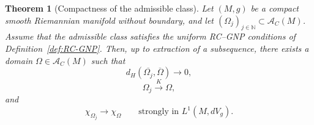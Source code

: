 \documentclass[10pt,a4paper]{amsart}
\newtheorem{theorem}{Theorem}
\begin{document}
\begin{theorem}[Compactness of the admissible class]
\label{thm:compactness-admissible}
Let $(M,g)$ be a compact smooth Riemannian manifold without boundary,
and let $(\Omega_j)_{j\in\mathbb N}\subset\mathcal A_C(M)$.
Assume that the admissible class satisfies the uniform RC--GNP
conditions of Definition~\ref{def:RC-GNP}. Then, up to extraction of
a subsequence, there exists a domain
$\Omega\in\mathcal A_C(M)$ such that
\begin{equation}
d_H(\overline{\Omega_j},\overline{\Omega})\longrightarrow0,
\label{eq:compactness-Hausdorff}
\end{equation}
\begin{equation}
\Omega_j\overset{K}{\longrightarrow}\Omega,
\label{eq:compactness-K}
\end{equation}
and
\begin{equation}
\chi_{\Omega_j}\longrightarrow\chi_\Omega
\qquad\text{strongly in }L^1(M,dV_g).
\label{eq:compactness-L1}
\end{equation}
\end{theorem}
\end{document}
